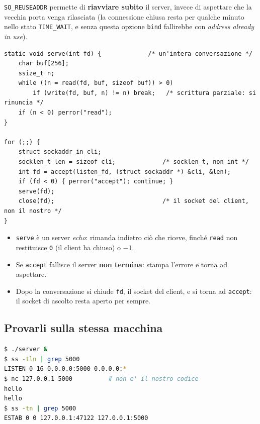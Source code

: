\texttt{SO\_REUSEADDR} permette di \textbf{riavviare subito} il server, invece di aspettare che la vecchia porta venga
rilasciata (la connessione chiusa resta per qualche minuto nello stato \texttt{TIME\_WAIT}, e senza questa opzione
\texttt{bind} fallirebbe con \emph{address already in use}).

\begin{lstlisting}[language={[POSIX]C}, style=wnumbers, title={server.c: il ciclo di accept}]
static void serve(int fd) {             /* un'intera conversazione */
    char buf[256];
    ssize_t n;
    while ((n = read(fd, buf, sizeof buf)) > 0)
        if (write(fd, buf, n) != n) break;   /* scrittura parziale: si rinuncia */
    if (n < 0) perror("read");
}

for (;;) {
    struct sockaddr_in cli;
    socklen_t len = sizeof cli;             /* socklen_t, non int */
    int fd = accept(listen_fd, (struct sockaddr *) &cli, &len);
    if (fd < 0) { perror("accept"); continue; }
    serve(fd);
    close(fd);                              /* il socket del client, non il nostro */
}
\end{lstlisting}

\begin{itemize}
    \item \texttt{serve} è un server \emph{echo}: rimanda indietro ciò che riceve, finché \texttt{read} non restituisce
          \texttt{0} (il client ha chiuso) o $-1$.
    \item Se \texttt{accept} fallisce il server \textbf{non termina}: stampa l'errore e torna ad aspettare.
    \item Dopo la conversazione si chiude \texttt{fd}, il socket del client, e si torna ad \texttt{accept}: il socket di
          ascolto resta aperto per sempre.
\end{itemize}


\subsection{Provarli sulla stessa macchina}

\begin{lstlisting}[language=bash, title={Il server, provato con nc prima di scrivere il client}]
$ ./server &
$ ss -tln | grep 5000
LISTEN 0 16 0.0.0.0:5000 0.0.0.0:*
$ nc 127.0.0.1 5000          # non e' il nostro codice
hello
hello
$ ss -tn | grep 5000
ESTAB 0 0 127.0.0.1:47122 127.0.0.1:5000
\end{lstlisting}

